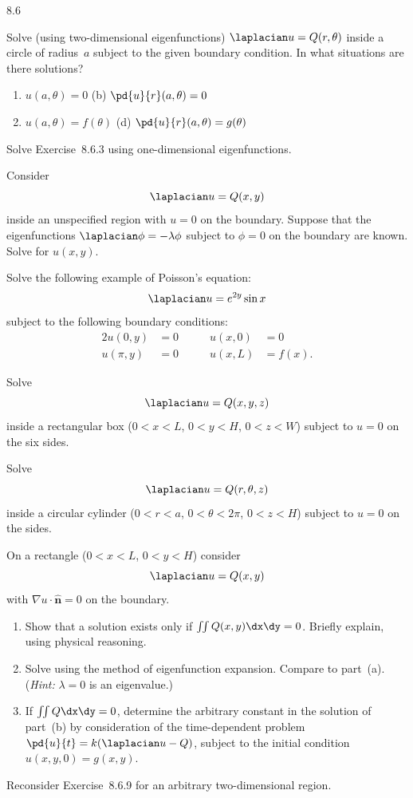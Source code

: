\begin{exercises}{8.6}
\item Solve (using two-dimensional eigenfunctions) $\laplacian u = Q(r,\theta)$ inside a circle of radius~$a$ subject to the given boundary condition.  In what situations are there solutions?
\begin{enumerate}
\item[\starred(a)] $u(a,\theta) = 0$ \qquad (b) $\pd{u}{r}(a,\theta) = 0$
\item[(c)] $u(a,\theta) = f(\theta)$ \qquad (d) $\pd{u}{r}(a,\theta) = g(\theta)$
\end{enumerate}

\item Solve Exercise~8.6.3 using one-dimensional eigenfunctions.

\item Consider
\[
\laplacian u = Q(x,y)
\]
inside an unspecified region with $u=0$ on the boundary.  Suppose that the eigenfunctions $\laplacian\phi = -\lambda\phi$ subject to $\phi = 0$ on the boundary are known.  Solve for $u(x,y)$.

\item[\starred 8.6.6.] Solve the following example of Poisson's equation:
\[
\laplacian u = e^{2y}\sin x
\]
subject to the following boundary conditions:
\begin{alignat*}{2}
u(0,y) &= 0 &\qquad u(x,0) &= 0 \\
u(\pi,y) &= 0 &\qquad u(x,L) &= f(x).
\end{alignat*}

\item Solve
\[
\laplacian u = Q(x,y,z)
\]
inside a rectangular box ($0 < x < L$, $0 < y < H$, $0 < z < W$) subject to $u = 0$ on the six sides.

\item Solve
\[
\laplacian u = Q(r,\theta,z)
\]
inside a circular cylinder ($0 < r < a$, $0 < \theta < 2\pi$, $0 < z < H$) subject to $u = 0$ on the sides.

\item On a rectangle ($0 < x < L$, $0 < y < H$) consider
\[
\laplacian u = Q(x,y)
\]
with $\nabla u\cdot\hat{\mathbf{n}} = 0$ on the boundary.
\begin{enumerate}
\item[(a)] Show that a solution exists only if $\iint Q(x,y)\dx\dy = 0$.  Briefly explain, using physical reasoning.
\item[(b)] Solve using the method of eigenfunction expansion.  Compare to part~(a).  (\textit{Hint:} $\lambda = 0$ is an eigenvalue.)
\item[(c)] If $\iint Q\dx\dy = 0$, determine the arbitrary constant in the solution of part~(b) by consideration of the time-dependent problem $\pd{u}{t} = k(\laplacian u - Q)$, subject to the initial condition $u(x,y,0) = g(x,y)$.
\end{enumerate}

\item Reconsider Exercise~8.6.9 for an arbitrary two-dimensional region.

\end{exercises}
